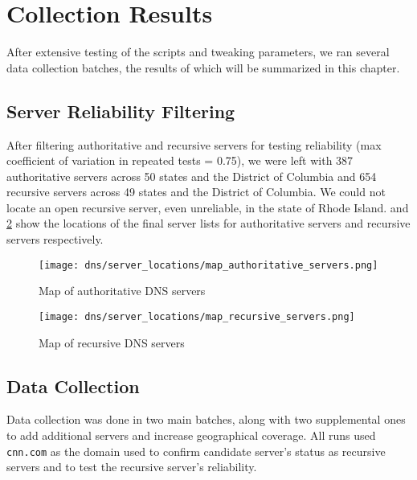\section{Collection Results}\label{sec:dns_results} %

After extensive testing of the scripts and tweaking parameters, we ran several data collection batches, the results of which will be summarized in this chapter.

\subsection{Server Reliability Filtering}

After filtering authoritative and recursive \dns servers for testing reliability (max coefficient of variation in repeated tests = 0.75), we were left with 387 authoritative servers across 50 states and the District of Columbia and 654 recursive servers across 49 states and the District of Columbia. We could not locate an open recursive \dns server, even unreliable, in the state of Rhode Island.  and \cref{fig:dns_cache_manipulation_map_of_recursive_servers} show the locations of the final server lists for authoritative servers and recursive servers respectively.

\begin{figure}[H]
    \centering
    \texttt{[image: dns/server\_locations/map\_authoritative\_servers.png]}
    \caption{Map of authoritative DNS servers}
    \label{fig:dns_cache_manipulation_map_of_authoritative_servers}
\end{figure}

\begin{figure}[H]
    \centering
    \texttt{[image: dns/server\_locations/map\_recursive\_servers.png]}
    \caption{Map of recursive DNS servers}
    \label{fig:dns_cache_manipulation_map_of_recursive_servers}
\end{figure}

\subsection{Data Collection}

Data collection was done in two main batches, along with two supplemental ones to add additional servers and increase geographical coverage. All runs used \texttt{cnn.com} as the domain used to confirm candidate server's status as recursive servers and to test the recursive server's reliability.


